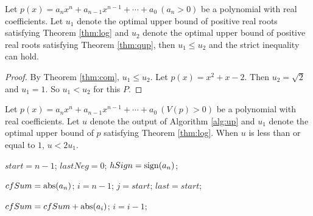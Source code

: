 \begin{theorem}\label{thm:com1}

  Let $p(x)=a_nx^n+a_{n-1}x^{n-1}+\cdots+a_0\ (a_n>0)$ be a polynomial with real coefficients. Let  $u_1$ denote the optimal upper bound of
  positive real roots satisfying Theorem \ref{thm:log} and $u_2$ denote the optimal upper bound of positive real roots satisfying Theorem \ref{thm:qup}, then $u_1\le u_2$ and the  strict inequality can hold.
\end{theorem}

\begin{proof}
  By Theorem \ref{thm:com}, $u_1\le u_2$.
  Let $p(x)=x^2+x-2$. Then $u_2=\sqrt{2}$ and $u_1=1$. So
  $u_1<u_2$ for this $P$.
\end{proof}


\begin{theorem}
  Let $p(x)=a_nx^n+a_{n-1}x^{n-1}+\cdots+a_0\ (V(p)> 0)$ be a polynomial with real coefficients. Let  $u$ denote the output of Algorithm \ref{alg:up} and $u_1$ denote the optimal upper bound of $p$ satisfying
 Theorem \ref{thm:log}. When $u$ is less than or equal to $1$, $u<2u_1$.

\end{theorem}


\begin{algorithm}
\caption{\less}
\DontPrintSemicolon
{}

$start=n-1$;\;
$lastNeg=0$;\;
$hSign={\rm sign}(a_n)$;\;


$cfSum={\rm abs}(a_n)$;\;
$i=n-1$;\;
$j=start$;\;
$last=start$;\;
{
	{

	 $cfSum=cfSum+{\rm abs}(a_i)$;\;
	 $i=i-1$;\;


	}


}

\label{alg:less}
\end{algorithm}



